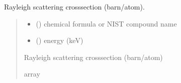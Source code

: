 \documentclass[letterpaper,10pt,english,openany,oneside]{sphinxmanual}
\begin{document}
\begin{fulllineitems}
\label{\detokenize{api/cross_sections:dxraylib.CSb_Rayl_CP}}
\pysigstartsignatures
{}
\pysigstopsignatures
\sphinxAtStartPar
Rayleigh scattering cross\sphinxhyphen{}section (barn/atom).
\begin{quote}\begin{description}
\begin{itemize}
\item {} 
\sphinxAtStartPar
{} () \textendash{} chemical formula or NIST compound name

\item {} 
\sphinxAtStartPar
{} () \textendash{} energy (keV)

\end{itemize}

\sphinxAtStartPar
Rayleigh scattering cross\sphinxhyphen{}section (barn/atom)

\sphinxAtStartPar
array

\end{description}\end{quote}

\end{fulllineitems}


\begin{DUlineblock}{0em}
\item[] 
\end{DUlineblock}
\end{document}
